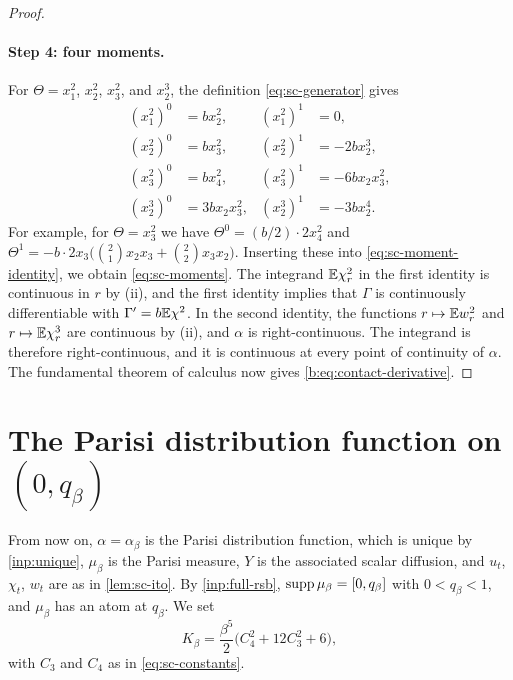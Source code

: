\begin{proof}
\paragraph{Step 4: four moments.}
For $\Theta=x_1^2$, $x_2^2$, $x_3^2$, and $x_2^3$, the definition
\eqref{eq:sc-generator} gives
\[
\begin{aligned}
 (x_1^2)^0&=bx_2^2,&(x_1^2)^1&=0,\\
 (x_2^2)^0&=bx_3^2,&(x_2^2)^1&=-2bx_2^3,\\
 (x_3^2)^0&=bx_4^2,&(x_3^2)^1&=-6bx_2x_3^2,\\
 (x_2^3)^0&=3bx_2x_3^2,&(x_2^3)^1&=-3bx_2^4.
\end{aligned}
\]
For example, for $\Theta=x_3^2$ we have $\Theta^0=(b/2)\cdot2x_4^2$ and
$\Theta^1=-b\cdot2x_3\bigl(\binom21x_2x_3+\binom22x_3x_2\bigr)$. Inserting
these into \eqref{eq:sc-moment-identity}, we obtain \eqref{eq:sc-moments}.
The integrand $\mathbb E\chi_r^2$ in the first identity is continuous in $r$ by
(ii), and the first identity implies that $\Gamma$ is continuously
differentiable with $\Gamma'=b\mathbb E\chi^2$. In the second identity, the
functions $r\mapsto\mathbb E w_r^2$ and $r\mapsto\mathbb E\chi_r^3$ are continuous by (ii),
and $\alpha$ is right-continuous. The integrand is therefore right-continuous,
and it is continuous at every point of continuity of $\alpha$. The
fundamental theorem of calculus now gives \eqref{b:eq:contact-derivative}.
\end{proof}

\section{The Parisi distribution function on \texorpdfstring{$(0,q_\beta)$}{(0,q)}}
\label{sec:sc-support}

From now on, $\alpha=\alpha_\beta$ is the Parisi distribution function, which
is unique by \cref{inp:unique}, $\mu_\beta$ is the Parisi measure, $Y$ is the
associated scalar diffusion, and $u_t$, $\chi_t$, $w_t$ are as in
\cref{lem:sc-ito}. By \cref{inp:full-rsb}, $\operatorname{supp}\mu_\beta=[0,q_\beta]$ with
$0<q_\beta<1$, and $\mu_\beta$ has an atom at $q_\beta$. We set
\begin{equation}\label{eq:sc-lipschitz-constant}
 K_\beta=\frac{\beta^5}2\bigl(C_4^2+12C_3^2+6\bigr),
\end{equation}
with $C_3$ and $C_4$ as in \eqref{eq:sc-constants}.

